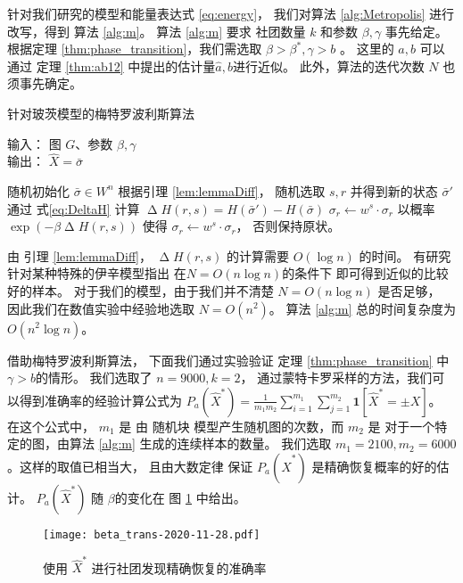 针对我们研究的模型和能量表达式 \eqref{eq:energy}，
我们对算法 \ref{alg:Metropolis} 进行
改写，得到
算法 \ref{alg:m}。
算法 \ref{alg:m} 要求
社团数量 $k$ 和参数 $\beta, \gamma$ 事先给定。
根据定理 \ref{thm:phase_transition}，我们需选取  $\beta>\beta^*, \gamma > b$
。
这里的 $a, b$
可以通过 定理 \ref{thm:ab12} 中提出的估计量$\hat{a},\hat{b}$进行近似。
此外，算法的迭代次数  $N$
也须事先确定。
\begin{algorithm}[H]
	\caption{针对玻茨模型的梅特罗波利斯算法} \label{alg:m}
	输入： 图 $G$、参数 $\beta,\gamma$ \\
	输出： $\hat{X} = \bar{\sigma}$
	\begin{algorithmic}[1]
		\STATE 随机初始化 $\bar{\sigma} \in W^n$ %
		\STATE 根据引理 \ref{lem:lemmaDiff}，
		随机选取 $s, r$ 并得到新的状态
		 $\bar{\sigma}'$
		\STATE 通过 式\eqref{eq:DeltaH} 计算 $\upDelta H(r,s) = H(\bar{\sigma}') - H(\bar{\sigma})$ %
		\STATE $\sigma_r \gets w^s \cdot \sigma_r$ %
		\ELSE
		\STATE 以概率 $\exp(-\beta \upDelta H(r,s))$ 使得
			$\sigma_r \leftarrow w^s \cdot \sigma_r$，
			否则保持原状。 %
		\ENDIF %
		\ENDFOR
	\end{algorithmic}
\end{algorithm}
 由 引理 \ref{lem:lemmaDiff}， $\upDelta H(r,s)$ 的计算需要 $O(\log n)$ 的时间。
有研究针对某种特殊的伊辛模型指出
在$N=O(n\log n)$的条件下 即可得到近似的比较好的样本\cite{mcmc}。
对于我们的模型，由于我们并不清楚 $ N = O(n\log n)$ 是否足够，
因此我们在数值实验中经验地选取 $N=O\left(n^2\right)$。
算法 \ref{alg:m} 总的时间复杂度为 $O\left(n^2 \log n \right)$。



借助梅特罗波利斯算法，
下面我们通过实验验证 定理 \ref{thm:phase_transition} 中  $\gamma > b$的情形。
我们选取了 $n=9000, k=2$，
通过蒙特卡罗采样的方法，我们可以得到准确率的经验计算公式为
$P_a(\hat{X}^*) = \frac{1}{m_1m_2}\sum_{i=1}^{m_1} \sum_{j=1}^{m_2} \mathbf{1}[\hat{X}^* = \pm X]$。
在这个公式中，
$m_1$ 是 由 随机块 模型产生随机图的次数，而
$m_2$ 是 对于一个特定的图，由算法 \ref{alg:m} 生成的连续样本的数量。
我们选取 $m_1=2100,m_2=6000$。这样的取值已相当大，
且由大数定律
保证 $P_a(\hat{X}^*)$ 是精确恢复概率的好的估计。
$P_a(\hat{X}^*)$ 随 $\beta$的变化在
图 \ref{fig:erh} 中给出。

\begin{figure}[ht!]
	\centering
		\texttt{[image: beta\_trans-2020-11-28.pdf]}
		\caption{使用 $\hat{X}^*$ 进行社团发现精确恢复的准确率}\label{fig:erh}
\end{figure}


